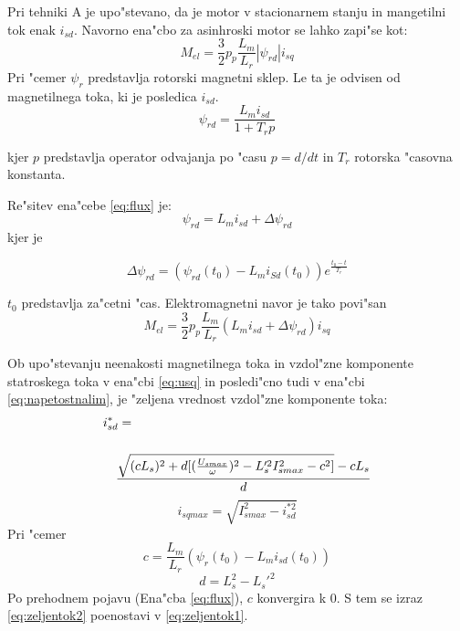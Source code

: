 \documentclass[journal,a4paper,twoside]{sty/IEEEtran}
\begin{document}
Pri tehniki A je upo"stevano, da je motor v stacionarnem stanju in mangetilni tok enak $i_{sd}$.
Navorno ena"cbo za asinhroski motor se lahko zapi"se kot:\cite{servopogoni}
\begin{equation}
\label{eq:navor2}
M_{el}=\frac{3}{2}p_p \frac{L_m}{L_r}|\psi_{rd}|i_{sq}
\end{equation}
Pri "cemer $\psi_{r}$ predstavlja rotorski magnetni sklep. Le ta je odvisen od magnetilnega toka, ki je posledica $i_{sd}$.
\begin{equation}
\label{eq:flux}
\psi_{rd}= \frac{L_m i_{sd}}{1+T_r p}
\end{equation}

kjer $p$ predstavlja operator odvajanja po "casu $p=d/dt$ in $T_r$ rotorska "casovna konstanta.

Re"sitev ena"cebe \ref{eq:flux} je:
\begin{equation}
\label{eq:Lm+delta}
\psi_{rd}=L_m i_{sd}+\Delta \psi_{rd}
\end{equation}
 kjer je
 
 \begin{equation}
\label{eq:delta}
\Delta \psi_{rd}=(\psi_{rd}(t_0)-L_m i_{Sd}(t_0))e^{\frac{t_0-t}{T_r}}
\end{equation}

$t_0$ predstavlja za"cetni "cas. Elektromagnetni navor je tako povi"san
\begin{equation}
\label{navor3}
M_{el}=\frac{3}{2}p_p \frac{L_m}{L_r}(L_m i_{sd}+\Delta \psi_{rd})i_{sq}
\end{equation}

Ob upo"stevanju neenakosti magnetilnega toka in vzdol"zne komponente statroskega toka v ena"cbi \ref{eq:usq} in posledi"cno tudi v ena"cbi \ref{eq:napetostnalim}, je "zeljena vrednost vzdol"zne komponente toka:
\begin{equation}
\label{eq:zeljentok2}
\centering
\begin{multlined}
i_{sd}^*= \\ \\
\frac{\sqrt{(c L_s)^2+d[(\frac{U_{smax}}{\omega})^2-L_s'^2I_{smax}^2-c^2]}-cL_s}{d}                 
\end{multlined}
\end{equation}
\begin{equation}
i_{sqmax}=\sqrt{I_{smax}^2-i_{sd}^{*2}}
\end{equation}
Pri "cemer
$$c=\frac{L_m}{L_r}(\psi_{r}(t_0)-L_m i_{sd}(t_0))$$
$$d=L_s^2-L_s'^2$$
Po prehodnem pojavu (Ena"cba \ref{eq:flux}), $c$ konvergira k 0. S tem se izraz \ref{eq:zeljentok2} poenostavi v \ref{eq:zeljentok1}.\cite{vas}
\end{document}
